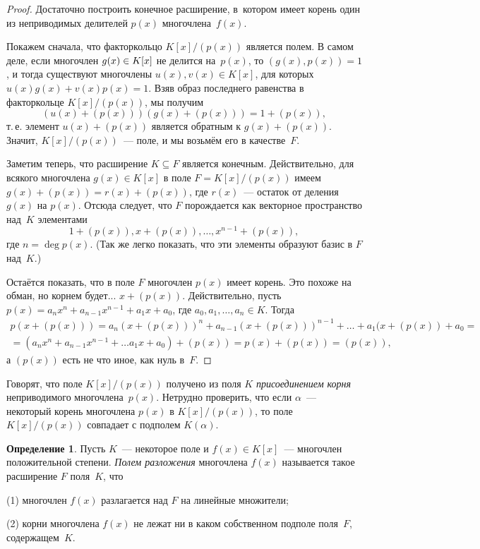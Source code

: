\documentclass[a4paper,10pt]{amsart}
\theoremstyle{definition}
\newtheorem{definition}{Определение}
\theoremstyle{remark}
\begin{document}
\begin{proof}
	Достаточно построить конечное расширение, в~котором имеет корень
	один из неприводимых делителей $p(x)$ многочлена~$f(x)$.
	
	Покажем сначала, что факторкольцо $K[x]/(p(x))$ является полем. В
	самом деле, если многочлен $g(x) \in\nobreak K[x]$ не делится
	на~$p(x)$, то $(g(x), p(x)) = 1$, и тогда существуют многочлены
	$u(x), v(x) \in K[x]$, для которых $u(x) g(x) + v(x) p(x) = 1$. Взяв
	образ последнего равенства в факторкольце $K[x] / (p(x))$, мы
	получим
	$$(u(x) + (p(x))) (g(x) + (p(x))) = 1 + (p(x)),$$ т.\,е. элемент
	$u(x)+(p(x))$ является обратным к $g(x)+(p(x))$. Значит, $K[x] /
	(p(x))$~--- поле, и мы возьмём его в качестве~$F$.
	
	Заметим теперь, что расширение $K \subseteq F$ является конечным.
	Действительно, для всякого многочлена $g(x) \in K[x]$ в поле $F =
	K[x]/(p(x))$ имеем $g(x) + (p(x)) = r(x) + (p(x))$, где $r(x)$~---
	остаток от деления $g(x)$ на $p(x)$. Отсюда следует, что $F$
	порождается как векторное пространство над~$K$ элементами
	$$
	1 + (p(x)), x + (p(x)), \ldots, x^{n-1} + (p(x)),
	$$
	где $n = \deg p(x)$. (Так же легко показать, что эти элементы
	образуют базис в $F$ над~$K$.)
	
	Остаётся показать, что в поле $F$ многочлен $p(x)$ имеет корень. Это
	похоже на обман, но корнем будет... $x + (p(x))$. Действительно,
	пусть $p(x) = a_n x^n + a_{n-1} x^{n-1} + a_1x + a_0$, где $a_0,
	a_1, \ldots, a_n \in K$. Тогда
	\begin{multline*}
		p(x + (p(x))) = a_n(x + (p(x)))^n + a_{n-1} (x + (p(x)))^{n-1} +
		\ldots + a_1 (x + (p(x)) + a_0 =\\
		= (a_nx^n + a_{n-1}x^{n-1} + \ldots a_1 x + a_0) + (p(x)) = p(x) +
		(p(x)) = (p(x)),
	\end{multline*}
	а $(p(x))$ есть не что иное, как нуль в~$F$.
\end{proof}

Говорят, что поле $K[x] / (p(x))$ получено из поля $K$ {\it
	присоединением корня} неприводимого многочлена~$p(x)$. Нетрудно
проверить, что если $\alpha$~--- некоторый корень многочлена $p(x)$
в $K[x]/(p(x))$, то поле $K[x]/(p(x))$ совпадает с подполем
$K(\alpha)$.

\begin{definition}
	Пусть $K$~--- некоторое поле и $f(x)\in K[x]$~--- многочлен
	положительной степени. {\it Полем разложения} многочлена $f(x)$
	называется такое расширение $F$ поля~$K$, что
	
	(1) многочлен $f(x)$ разлагается над $F$ на линейные множители;
	
	(2) корни многочлена $f(x)$ не лежат ни в каком собственном подполе
	поля~$F$, содержащем~$K$.
\end{definition}
\end{document}

